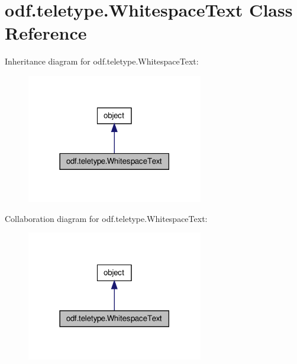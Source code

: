 \hypertarget{classodf_1_1teletype_1_1WhitespaceText}{\section{odf.\+teletype.\+Whitespace\+Text Class Reference}
\label{classodf_1_1teletype_1_1WhitespaceText}
}


Inheritance diagram for odf.\+teletype.\+Whitespace\+Text\+:
\nopagebreak
\begin{figure}[H]
\begin{center}
\leavevmode
\includegraphics[width=218pt]{classodf_1_1teletype_1_1WhitespaceText__inherit__graph}
\end{center}
\end{figure}


Collaboration diagram for odf.\+teletype.\+Whitespace\+Text\+:
\nopagebreak
\begin{figure}[H]
\begin{center}
\leavevmode
\includegraphics[width=218pt]{classodf_1_1teletype_1_1WhitespaceText__coll__graph}
\end{center}
\end{figure}
